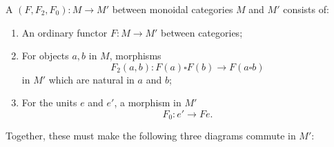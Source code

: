 A  $(F, F_2, F_0) : M \to M'$ between monoidal categories $M$ and $M'$ consists of:

\begin{enumerate}
\item[(i)] An ordinary functor $F : M \to M'$ between categories;
\item[(ii)] For objects $a, b$ in $M$, morphisms
  $$F_2(a, b) : F(a) \square F(b) \to F(a \square b)$$
  in $M'$ which are natural in $a$ and $b$;
\item[(iii)] For the units $e$ and $e'$, a morphism in $M'$
  $$F_0 : e' \to F e.$$
\end{enumerate}

Together, these must make the following three diagrams commute in $M'$:

\begin{center}
\end{center}

\begin{center}
\end{center}

\begin{center}
\end{center}
